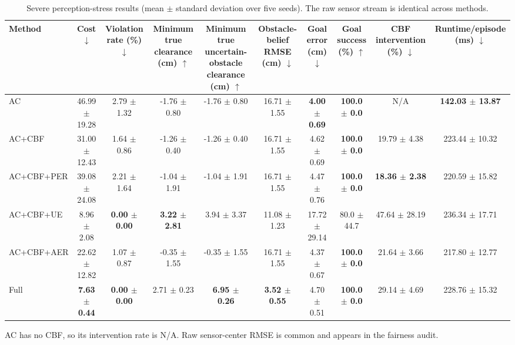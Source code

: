 \begin{table}[t]
\centering
\caption{Severe perception-stress results (mean $\pm$ standard deviation over five seeds). The raw sensor stream is identical across methods.}
\label{tab:v17_1_severe_results}
\begin{tabular}{lccccccccc}
\toprule
Method & Cost $\downarrow$ & Violation rate (\%) $\downarrow$ & Minimum true clearance (cm) $\uparrow$ & Minimum true uncertain-obstacle clearance (cm) $\uparrow$ & Obstacle-belief RMSE (cm) $\downarrow$ & Goal error (cm) $\downarrow$ & Goal success (\%) $\uparrow$ & CBF intervention (\%) $\downarrow$ & Runtime/episode (ms) $\downarrow$ \\
\midrule
AC & 46.99 $\pm$ 19.28 & 2.79 $\pm$ 1.32 & -1.76 $\pm$ 0.80 & -1.76 $\pm$ 0.80 & 16.71 $\pm$ 1.55 & \textbf{4.00 $\pm$ 0.69} & \textbf{100.0 $\pm$ 0.0} & N/A & \textbf{142.03 $\pm$ 13.87} \\
AC+CBF & 31.00 $\pm$ 12.43 & 1.64 $\pm$ 0.86 & -1.26 $\pm$ 0.40 & -1.26 $\pm$ 0.40 & 16.71 $\pm$ 1.55 & 4.62 $\pm$ 0.69 & \textbf{100.0 $\pm$ 0.0} & 19.79 $\pm$ 4.38 & 223.44 $\pm$ 10.32 \\
AC+CBF+PER & 39.08 $\pm$ 24.08 & 2.21 $\pm$ 1.64 & -1.04 $\pm$ 1.91 & -1.04 $\pm$ 1.91 & 16.71 $\pm$ 1.55 & 4.47 $\pm$ 0.76 & \textbf{100.0 $\pm$ 0.0} & \textbf{18.36 $\pm$ 2.38} & 220.59 $\pm$ 15.82 \\
AC+CBF+UE & 8.96 $\pm$ 2.08 & \textbf{0.00 $\pm$ 0.00} & \textbf{3.22 $\pm$ 2.81} & 3.94 $\pm$ 3.37 & 11.08 $\pm$ 1.23 & 17.72 $\pm$ 29.14 & 80.0 $\pm$ 44.7 & 47.64 $\pm$ 28.19 & 236.34 $\pm$ 17.71 \\
AC+CBF+AER & 22.62 $\pm$ 12.82 & 1.07 $\pm$ 0.87 & -0.35 $\pm$ 1.55 & -0.35 $\pm$ 1.55 & 16.71 $\pm$ 1.55 & 4.37 $\pm$ 0.67 & \textbf{100.0 $\pm$ 0.0} & 21.64 $\pm$ 3.66 & 217.80 $\pm$ 12.77 \\
Full & \textbf{7.63 $\pm$ 0.44} & \textbf{0.00 $\pm$ 0.00} & 2.71 $\pm$ 0.23 & \textbf{6.95 $\pm$ 0.26} & \textbf{3.52 $\pm$ 0.55} & 4.70 $\pm$ 0.51 & \textbf{100.0 $\pm$ 0.0} & 29.14 $\pm$ 4.69 & 228.76 $\pm$ 15.32 \\
\bottomrule
\end{tabular}
\begin{minipage}{0.99\textwidth}\footnotesize\vspace{2pt}
AC has no CBF, so its intervention rate is N/A. Raw sensor-center RMSE is common and appears in the fairness audit.
\end{minipage}
\end{table}